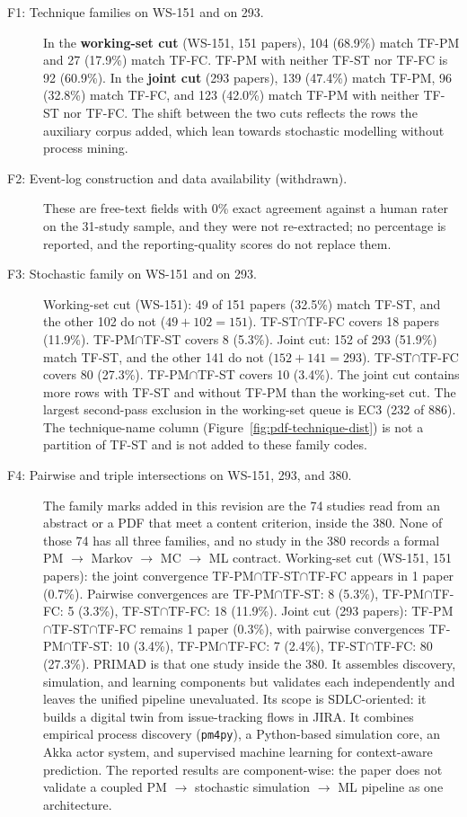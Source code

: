 \begin{description}

\item[F1: Technique families on WS-151 and on 293.]
In the \textbf{working-set cut} (WS-151, 151 papers), 104 (68.9\%) match TF-PM
and 27 (17.9\%) match TF-FC. TF-PM with neither TF-ST nor TF-FC is 92
(60.9\%). In the \textbf{joint cut} (293 papers), 139 (47.4\%) match
TF-PM, 96 (32.8\%) match TF-FC, and 123 (42.0\%) match TF-PM with neither
TF-ST nor TF-FC. The shift between the two cuts reflects the rows the auxiliary corpus
added, which lean towards stochastic modelling without process mining.

\item[F2: Event-log construction and data availability (withdrawn).]
These are free-text fields with 0\% exact agreement against a human rater
on the 31-study sample, and they were not re-extracted; no percentage is
reported, and the reporting-quality scores do not replace them.

\item[F3: Stochastic family on WS-151 and on 293.]
Working-set cut (WS-151): 49 of 151 papers (32.5\%) match TF-ST, and the other 102
do not ($49+102=151$). TF-ST$\cap$TF-FC covers 18 papers (11.9\%).
TF-PM$\cap$TF-ST covers 8 (5.3\%). Joint cut: 152 of 293 (51.9\%) match
TF-ST, and the other 141 do not ($152+141=293$). TF-ST$\cap$TF-FC covers
80 (27.3\%). TF-PM$\cap$TF-ST covers 10 (3.4\%). The joint cut contains
more rows with TF-ST and without TF-PM than the working-set cut. The
largest second-pass exclusion in the working-set queue is EC3 (232 of
886). The technique-name column (Figure~\ref{fig:pdf-technique-dist}) is
not a partition of TF-ST and is not added to these family codes.

\item[F4: Pairwise and triple intersections on WS-151, 293, and 380.]
The family marks added in this revision are the 74 studies read from an
abstract or a PDF that meet a content criterion, inside the 380. None of
those 74 has all three families, and no study in the 380 records a formal
PM $\rightarrow$ Markov $\rightarrow$ MC $\rightarrow$ ML contract.
Working-set cut (WS-151, 151 papers): the joint convergence
TF-PM$\cap$TF-ST$\cap$TF-FC appears in 1 paper (0.7\%). Pairwise
convergences are TF-PM$\cap$TF-ST: 8 (5.3\%), TF-PM$\cap$TF-FC: 5 (3.3\%),
TF-ST$\cap$TF-FC: 18 (11.9\%). Joint cut (293 papers):
TF-PM$\cap$TF-ST$\cap$TF-FC remains 1 paper (0.3\%), with pairwise
convergences TF-PM$\cap$TF-ST: 10 (3.4\%), TF-PM$\cap$TF-FC: 7 (2.4\%),
TF-ST$\cap$TF-FC: 80 (27.3\%).
PRIMAD \cite{guinea2025} is that one study inside the 380. It assembles discovery,
simulation, and learning components but validates each independently and
leaves the unified pipeline unevaluated. Its scope is SDLC-oriented: it builds a
digital twin from issue-tracking flows in JIRA. It combines empirical
process discovery (\texttt{pm4py}), a Python-based simulation core, an Akka
actor system, and supervised machine learning
for context-aware prediction. The reported results are component-wise:
the paper does not validate a coupled PM $\rightarrow$ stochastic
simulation $\rightarrow$ ML pipeline as one architecture.


\end{description}
